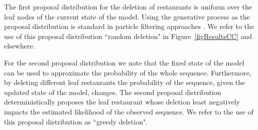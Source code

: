 The first proposal distribution for the deletion of restaurants is uniform over the leaf nodes of the current state of the model.  Using the generative process as the proposal distribution is standard in particle filtering approaches \cite{Doucet2001}.  We refer to the use of this proposal distribution ``random deletion" in Figure~\ref{figResultsCC} and elsewhere.

For the second proposal distribution we note that the fixed state of the model can be used to approximate the probability of the whole sequence. Furthermore, by deleting different leaf restaurants the probability of the sequence, given the updated state of the model, changes. The second proposal distribution deterministically proposes the leaf restaurant whose deletion least negatively impacts the estimated likelihood of the observed sequence.  We refer to the use of this proposal distribution as ``greedy deletion".





